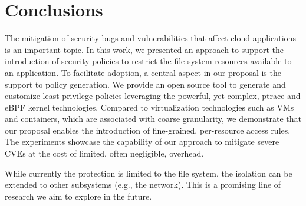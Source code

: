 \section{Conclusions}
\label{dmng:sect:conclusions}

The mitigation of security bugs and vulnerabilities that affect cloud
applications is an important topic. In this work, we presented an
approach to support the introduction of security policies to restrict
the file system resources available to an application. To facilitate
adoption, a central aspect in our proposal is the support to policy
generation. We provide an open source tool to generate and customize
least privilege policies leveraging the powerful, yet complex, ptrace
and eBPF kernel technologies.  Compared to virtualization technologies
such as VMs and containers, which are associated with coarse
granularity, we demonstrate that our proposal enables the introduction
of fine-grained, per-resource access rules. The experiments showcase
the capability of our approach to mitigate severe CVEs at the cost of
limited, often negligible, overhead.

While currently the protection is limited to the file system, the
isolation can be extended to other subsystems (e.g., the network).
This is a promising line of research we aim to explore in the future.

